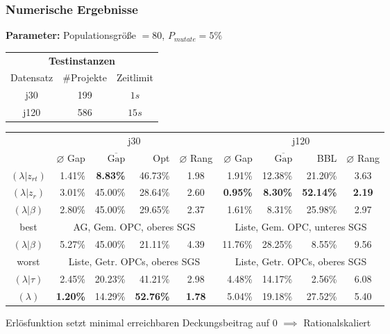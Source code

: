 \begin{frame}[t]
\frametitle{Numerische Ergebnisse}
\begin{footnotesize}
\textbf{Parameter:} Populationsgröße $=80$, $P_{mutate}=5\%$\\

\begin{center}
	\begin{tabular}{ccc}
		\multicolumn{3}{c}{\textbf{Testinstanzen}}\\
		Datensatz & \#Projekte & Zeitlimit\\
		j30 & 199 & $1s$\\
		j120 & 586 & $15s$
	\end{tabular}
\end{center}

\begin{center}	
\tabcolsep=0.16cm
\begin{tabular}{|c|rrrc|rrrc|}
	\hline
	& \multicolumn{4}{c|}{j30} & \multicolumn{4}{c|}{j120}\\
	 & $\varnothing$ Gap & $\overline{\mbox{Gap}}$ & Opt & $\varnothing$ Rang & $\varnothing$ Gap & $\overline{\mbox{Gap}}$ & BBL & $\varnothing$ Rang \\[3pt]
	\hline
   $(\lambda|z_{rt})$&1.41\%&\textbf{8.83\%}&46.73\%&1.98&1.91\%&12.38\%&21.20\%&3.63\\
	\hline
   $(\lambda|z_r)$&3.01\%&45.00\%&28.64\%&2.60&\textbf{0.95\%}&\textbf{8.30\%}&\textbf{52.14\%}&\textbf{2.19}\\
	\hline
	$(\lambda|\beta)$&2.80\%&45.00\%&29.65\%&2.37&1.61\%&8.31\%&25.98\%&2.97\\
	best & \multicolumn{4}{c|}{AG, Gem. OPC, oberes SGS} & \multicolumn{4}{c|}{Liste, Gem. OPC, unteres SGS}\\
	\hline
	$(\lambda|\beta)$&5.27\%&45.00\%&21.11\%&4.39&11.76\%&28.25\%&8.55\%&9.56\\
	worst & \multicolumn{4}{c|}{Liste, Getr. OPCs, oberes SGS} & \multicolumn{4}{c|}{Liste, Getr. OPCs, oberes SGS}\\
	\hline
	$(\lambda|\tau)$&2.45\%&20.23\%&41.21\%&2.98&4.48\%&14.17\%&2.56\%&6.08\\
	\hline
	$(\lambda)$& \textbf{1.20\%}&14.29\%&\textbf{52.76\%}&\textbf{1.78}&5.04\%&19.18\%&27.52\%&5.40\\
	\hline
\end{tabular}
\end{center}

Erlösfunktion setzt minimal erreichbaren Deckungsbeitrag auf 0 $\implies$ Rationalskaliert

\end{footnotesize}	

\end{frame}

